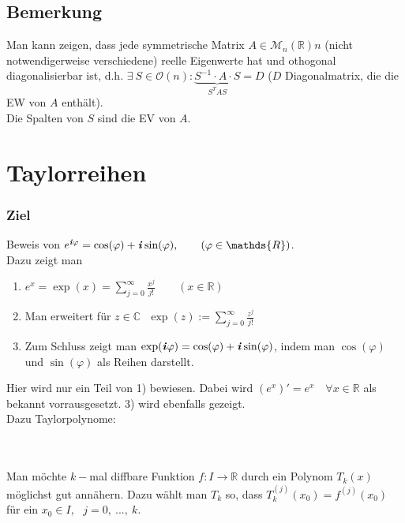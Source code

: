 \documentclass[a4paper, 12pt,titlepage, pdf, headsepline]{scrartcl}
\newcommand{\R}{\mathds{R}}
\newcommand{\M}{\mathcal{M}}
\newcommand{\C}{\mathds{C}}
\renewcommand{\i}{\textbf{\textit{i}}}
\renewcommand{\>}{\rightarrow}
\renewcommand{\*}{\cdot}
\renewcommand{\phi}{\varphi}
\begin{document}
\subsection{Bemerkung}
Man kann zeigen, dass jede symmetrische Matrix $A \in \M_n(\R)$\quad $n$ (nicht notwendigerweise verschiedene) reelle Eigenwerte hat und othogonal diagonalisierbar ist, d.h. $\exists ~S \in \mathcal{O}(n): \underbrace{S^{-1} \cdot A \cdot S}_{S^TAS} = D$ ($D$ Diagonalmatrix, die die EW von $A$ enthält).\\
Die Spalten von $S$ sind die EV von $A$.
\newpage
\section{Taylorreihen}
\subsubsection*{Ziel}
 Beweis von $e^{\i\phi} = \cos(\phi) + \i\sin(\phi),\qquad (\phi \in \R)$.\\
Dazu zeigt man
\begin{enumerate}
	\item $e^x = \exp(x) = \sum_{j = 0}^{\infty} \frac{x^j}{j!} \qquad (x \in \R)$ 
	\item Man erweitert für $z \in \C ~~~\exp(z) := \sum_{j = 0}^{\infty}\frac{z^j}{j!}$
	\item Zum Schluss zeigt man $\exp(\i\phi)= \cos(\phi) + \i \sin(\phi)$, indem man $\cos(\phi)$ und $\sin(\phi)$ als Reihen darstellt.
\end{enumerate}
Hier wird nur ein Teil von 1) bewiesen. Dabei wird $(e^x)' = e^x \quad \forall x \in \R$ als bekannt vorrausgesetzt. 3) wird ebenfalls gezeigt.\\
Dazu Taylorpolynome:\\
\\
\\
Man möchte $k-$mal diffbare Funktion $f: I \rightarrow \R$ durch ein Polynom $T_k(x)$ möglichst gut annähern. Dazu wählt man $T_k$ so, dass $T_k^{(j)}(x_0) = f^{(j)}(x_0)$ für ein $x_0 \in I, ~~~j = 0,~...,~k.$
\end{document}
